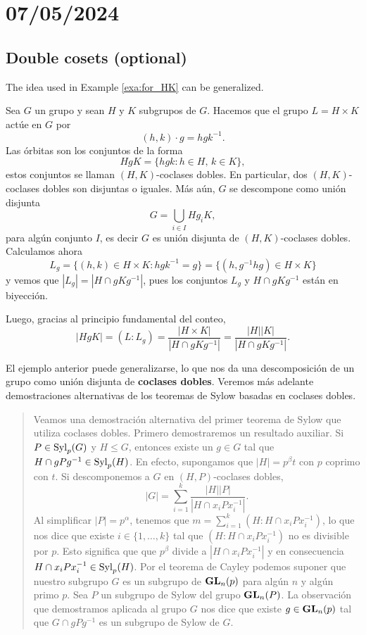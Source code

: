 \section{07/05/2024}

\subsection{Double cosets (optional)}

The idea used in Example \ref{exa:for_HK} can be generalized. 

\begin{example}
Sea $G$ un grupo y sean $H$ y $K$ subgrupos de $G$. Hacemos
que el grupo $L=H\times K$ actúe en $G$ por
\[
(h,k)\cdot g=hgk^{-1}.
\]
Las órbitas son los conjuntos de la forma
\[
HgK=\{hgk:h\in H,\,k\in K\},
\]
estos conjuntos se llaman $(H,K)$-coclases dobles.
En particular, dos $(H,K)$-coclases dobles son disjuntas o iguales. Más aún,
$G$ se descompone como unión disjunta
\[
G=\bigcup_{i\in I}Hg_iK,
\]
para algún conjunto $I$, es decir $G$
es unión disjunta de $(H,K)$-coclases dobles.
Calculamos ahora
\[
L_g=\{(h,k)\in H\times K:hgk^{-1}=g\}=\{(h,g^{-1}hg)\in H\times K\}
\]
y vemos que $|L_g|=|H\cap gKg^{-1}|$, pues los conjuntos $L_g$ y $H\cap gKg^{-1}$ están en biyección.

Luego,
gracias al principio fundamental del conteo,
\[
|HgK|=(L:L_g)=\frac{|H\times K|}{|H\cap gKg^{-1}|}=\frac{|H||K|}{|H\cap gKg^{-1}|}.
\]
\end{example}

El ejemplo anterior puede generalizarse, lo que nos da una descomposición
de un grupo como unión disjunta de \textbf{coclases dobles}. Veremos más adelante
demostraciones alternativas de los teoremas de Sylow basadas en
coclases dobles.

\begin{quote}
Veamos una demostración alternativa del primer teorema de Sylow
que utiliza coclases dobles.
Primero demostraremos un resultado auxiliar. Si $P\in\mathrm{Syl}_p(G)$ y $H\leq G$, entonces
existe un $g\in G$ tal que $H\cap gPg^{-1}\in\mathrm{Syl}_p(H)$. En efecto, supongamos que
$|H|=p^\beta t$ con $p$ coprimo con $t$.
Si descomponemos a $G$ en $(H,P)$-coclases dobles,
\[
|G|=\sum_{i=1}^k \frac{|H||P|}{|H\cap x_iPx_i^{-1}|}.
\]
Al simplificar $|P|=p^\alpha$, tenemos que $m=\sum_{i=1}^k(H:H\cap x_iPx_i^{-1})$, lo que nos dice
que existe $i\in\{1,\dots,k\}$ tal que
$(H:H\cap x_iPx_i^{-1})$ no es divisible por $p$. Esto significa que que
$p^\beta$ divide a $|H\cap x_iPx_i^{-1}|$ y en consecuencia $H\cap x_iPx_i^{-1}\in\mathrm{Syl}_p(H)$.
Por el teorema de Cayley podemos suponer que nuestro subgrupo $G$ es un subgrupo
de $\mathbf{GL}_n(p)$ para algún $n$ y algún primo $p$. Sea $P$ un subgrupo de Sylow
del grupo $\mathbf{GL}_n(P)$. La observación que demostramos
aplicada al grupo $G$ nos dice que existe $g\in \mathbf{GL}_n(p)$ tal que $G\cap gPg^{-1}$ es un subgrupo de
Sylow de $G$.
\end{quote}

